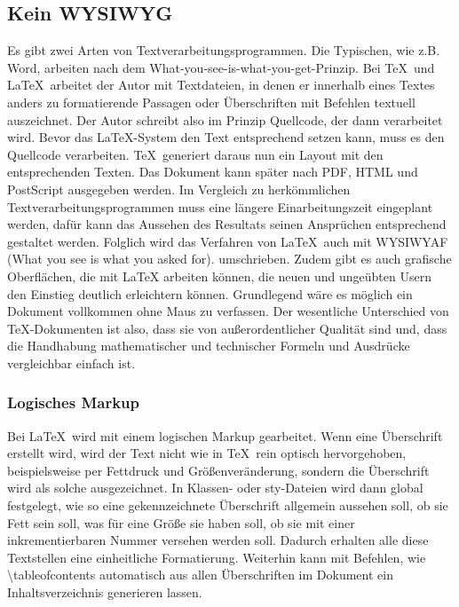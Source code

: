 \subsection{Kein WYSIWYG}
Es gibt zwei Arten von Textverarbeitungsprogrammen. Die Typischen, wie z.B. Word, arbeiten nach dem What-you-see-is-what-you-get-Prinzip. Bei \TeX\ und \LaTeX\ arbeitet der Autor mit Textdateien, in denen er innerhalb eines Textes anders zu formatierende Passagen oder Überschriften mit Befehlen textuell auszeichnet. Der Autor schreibt also im Prinzip Quellcode, der dann verarbeitet wird. Bevor das \LaTeX-System den Text entsprechend setzen kann, muss es den Quellcode verarbeiten. \TeX\ generiert daraus nun ein Layout mit den entsprechenden Texten. Das Dokument kann später nach PDF, HTML und PostScript ausgegeben werden. Im Vergleich zu herkömmlichen Textverarbeitungsprogrammen muss eine längere Einarbeitungszeit eingeplant werden, dafür kann das Aussehen des Resultats seinen Ansprüchen entsprechend gestaltet werden. Folglich wird das Verfahren von \LaTeX\ auch mit WYSIWYAF (What you see is what you asked for). umschrieben. Zudem gibt es auch grafische Oberflächen, die mit LaTeX arbeiten können, die neuen und ungeübten Usern den Einstieg deutlich erleichtern können. Grundlegend wäre es möglich ein Dokument vollkommen ohne Maus zu verfassen.
Der wesentliche Unterschied von \TeX-Dokumenten ist also, dass sie von außerordentlicher Qualität sind und, dass die Handhabung mathematischer und technischer Formeln und Ausdrücke vergleichbar einfach ist. \cite[vgl.][S.2]{Oechsner2015}

\subsubsection{Logisches Markup}
Bei \LaTeX\ wird mit einem logischen Markup gearbeitet. Wenn eine Überschrift erstellt wird, wird der Text nicht wie in \TeX\ rein optisch hervorgehoben, beispielsweise per Fettdruck und Größenveränderung, sondern die Überschrift wird als solche ausgezeichnet. In Klassen- oder sty-Dateien wird dann global festgelegt, wie so eine gekennzeichnete Überschrift allgemein aussehen soll, ob sie Fett sein soll, was für eine Größe sie haben soll, ob sie mit einer inkrementierbaren Nummer versehen werden soll. Dadurch erhalten alle diese Textstellen eine einheitliche Formatierung. Weiterhin kann mit Befehlen, wie \textbackslash tableofcontents automatisch aus allen Überschriften im Dokument ein Inhaltsverzeichnis generieren lassen.


